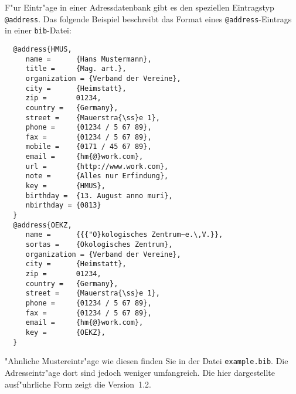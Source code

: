 \documentclass{article}
\newcommand*{\File}[1]{\texttt{#1}}
\begin{document}
F"ur Eintr"age in einer Adressdatenbank gibt es den 
speziellen Eintragstyp \verb|@address|. Das folgende Beispiel 
beschreibt das Format eines \verb|@address|-Eintrags 
in einer \File{bib}-Datei:


\begin{small}
\begin{verbatim}
  @address{HMUS,
     name =      {Hans Mustermann},
     title =     {Mag. art.},
     organization = {Verband der Vereine},
     city =      {Heimstatt},
     zip =       01234,
     country =   {Germany},
     street =    {Mauerstra{\ss}e 1},
     phone =     {01234 / 5 67 89},
     fax =       {01234 / 5 67 89},
     mobile =    {0171 / 45 67 89},
     email =     {hm{@}work.com},
     url =       {http://www.work.com},
     note =      {Alles nur Erfindung},
     key =       {HMUS},
     birthday =  {13. August anno muri},
     nbirthday = {0813}
  }
  @address{OEKZ,
     name =      {{{"O}kologisches Zentrum~e.\,V.}},
     sortas =    {Okologisches Zentrum},
     organization = {Verband der Vereine},
     city =      {Heimstatt},
     zip =       01234,
     country =   {Germany},
     street =    {Mauerstra{\ss}e 1},
     phone =     {01234 / 5 67 89},
     fax =       {01234 / 5 67 89},
     email =     {hm{@}work.com},
     key =       {OEKZ},
  }
\end{verbatim}
\end{small}

"Ahnliche Mustereintr"age wie diesen finden Sie in der Datei
\File{example.bib}. Die Adresseintr"age
dort sind jedoch weniger umfangreich. Die hier dargestellte
ausf"uhrliche Form zeigt die Version~1.2.
\end{document}
